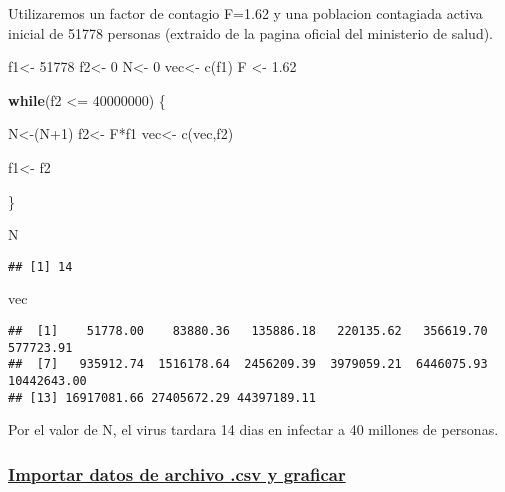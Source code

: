 \documentclass[preprint, 3p,
authoryear]{elsarticle} %
\newenvironment{Shaded}{\begin{snugshade}}{\end{snugshade}}
\newcommand{\ControlFlowTok}[1]{\textcolor[rgb]{0.13,0.29,0.53}{\textbf{#1}}}
\newcommand{\DecValTok}[1]{\textcolor[rgb]{0.00,0.00,0.81}{#1}}
\newcommand{\FloatTok}[1]{\textcolor[rgb]{0.00,0.00,0.81}{#1}}
\newcommand{\FunctionTok}[1]{\textcolor[rgb]{0.00,0.00,0.00}{#1}}
\newcommand{\NormalTok}[1]{#1}
\newcommand{\OtherTok}[1]{\textcolor[rgb]{0.56,0.35,0.01}{#1}}
\newcommand{\SpecialCharTok}[1]{\textcolor[rgb]{0.00,0.00,0.00}{#1}}
\begin{document}
Utilizaremos un factor de contagio F=1.62 y una poblacion contagiada
activa inicial de 51778 personas (extraido de la pagina oficial del
ministerio de salud).

\begin{Shaded}
\begin{Highlighting}[]
\NormalTok{f1}\OtherTok{\textless{}{-}} \DecValTok{51778}
\NormalTok{f2}\OtherTok{\textless{}{-}} \DecValTok{0}
\NormalTok{N}\OtherTok{\textless{}{-}} \DecValTok{0}
\NormalTok{vec}\OtherTok{\textless{}{-}} \FunctionTok{c}\NormalTok{(f1)}
\NormalTok{F }\OtherTok{\textless{}{-}} \FloatTok{1.62}

\ControlFlowTok{while}\NormalTok{(f2 }\SpecialCharTok{\textless{}=} \DecValTok{40000000}\NormalTok{) \{}
  
\NormalTok{  N}\OtherTok{\textless{}{-}}\NormalTok{(N}\SpecialCharTok{+}\DecValTok{1}\NormalTok{)}
\NormalTok{  f2}\OtherTok{\textless{}{-}}\NormalTok{ F}\SpecialCharTok{*}\NormalTok{f1}
\NormalTok{  vec}\OtherTok{\textless{}{-}} \FunctionTok{c}\NormalTok{(vec,f2)}
  
\NormalTok{  f1}\OtherTok{\textless{}{-}}\NormalTok{ f2}
  
\NormalTok{\}}

\NormalTok{N}
\end{Highlighting}
\end{Shaded}

\begin{verbatim}
## [1] 14
\end{verbatim}

\begin{Shaded}
\begin{Highlighting}[]
\NormalTok{vec}
\end{Highlighting}
\end{Shaded}

\begin{verbatim}
##  [1]    51778.00    83880.36   135886.18   220135.62   356619.70   577723.91
##  [7]   935912.74  1516178.64  2456209.39  3979059.21  6446075.93 10442643.00
## [13] 16917081.66 27405672.29 44397189.11
\end{verbatim}

Por el valor de N, el virus tardara 14 dias en infectar a 40 millones de
personas.

\hypertarget{importar-datos-de-archivo-.csv-y-graficar}{%
\subsubsection{\texorpdfstring{\uline{\textbf{Importar datos de archivo
.csv y
graficar}}}{Importar datos de archivo .csv y graficar}}\label{importar-datos-de-archivo-.csv-y-graficar}}
\end{document}
